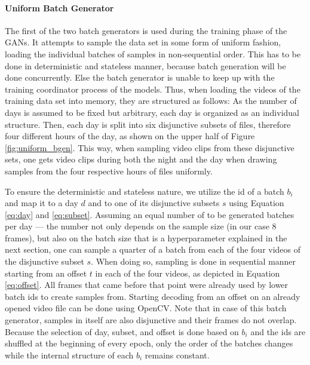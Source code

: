 \paragraph{Uniform Batch Generator} \label{par:uniform_bgen}
The first of the two batch generators is used during the training phase of the GANs. It attempts to sample the data set in some form of uniform fashion, loading the individual batches of samples in non-sequential order. This has to be done in deterministic and stateless manner, because batch generation will be done concurrently. Else the batch generator is unable to keep up with the training coordinator process of the models. Thus, when loading the videos of the training data set into memory, they are structured as follows: As the number of days is assumed to be fixed but arbitrary, each day is organized as an individual structure. Then, each day is split into six disjunctive subsets of files, therefore four different hours of the day, as shown on the upper half of Figure \ref{fig:uniform_bgen}. This way, when sampling video clips from these disjunctive sets, one gets video clips during both the night and the day when drawing samples from the four respective hours of files uniformly.

To ensure the deterministic and stateless nature, we utilize the id of a batch $b_i$ and map it to a day $d$ and to one of its disjunctive subsets $s$ using Equation \ref{eq:day} and \ref{eq:subset}. Assuming an equal number of to be generated batches per day --- the number not only depends on the sample size (in our case 8 frames), but also on the batch size that is a hyperparameter explained in the next section, one can sample a quarter of a batch from each of the four videos of the disjunctive subset $s$. When doing so, sampling is done in sequential manner starting from an offset $t$ in each of the four videos, as depicted in Equation \ref{eq:offset}. All frames that came before that point were already used by lower batch ids to create samples from. Starting decoding from an offset on an already opened video file can be done using OpenCV. Note that in case of this batch generator, samples in itself are also disjunctive and their frames do not overlap. Because the selection of day, subset, and offset is done based on $b_i$ and the ids are shuffled at the beginning of every epoch, only the order of the batches changes while the internal structure of each $b_i$ remains constant.

